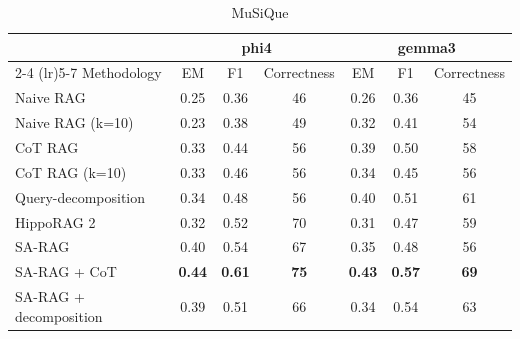 \documentclass{article}
\begin{document}
\begin{table}[h!]
    \centering
    \caption{Results of RAG evaluation on two multi-hop benchmarks.}
    \label{tab:rag_evaluation}

    \begin{subtable}[t]{\textwidth}
        \centering
        \caption{MuSiQue}
        \label{tab:rag_bench2}
        \begin{tabular}{lcccccc}
            \toprule
            & \multicolumn{3}{c}{phi4} & \multicolumn{3}{c}{gemma3} \\
            \cmidrule(lr){2-4} \cmidrule(lr){5-7}
            Methodology & EM & F1 & Correctness & EM & F1 & Correctness \\
            \midrule
            Naive RAG            & 0.25 & 0.36 & 46 & 0.26 & 0.36 & 45 \\
            Naive RAG (k=10)     & 0.23 & 0.38 & 49 & 0.32 & 0.41 & 54 \\
            CoT RAG              & 0.33 & 0.44 & 56 & 0.39 & 0.50 & 58 \\
            CoT RAG (k=10)       & 0.33 & 0.46 & 56 & 0.34 & 0.45 & 56 \\
            Query-decomposition  & 0.34 & 0.48 & 56 & 0.40 & 0.51 & 61 \\
            HippoRAG 2           & 0.32 & 0.52 & 70 & 0.31 & 0.47 & 59\\
            SA-RAG               & 0.40 & 0.54 & 67 & 0.35 & 0.48 & 56 \\
            SA-RAG + CoT          & \textbf{0.44} & \textbf{0.61} & \textbf{75} & \textbf{0.43} & \textbf{0.57} & \textbf{69} \\
            SA-RAG + decomposition& 0.39 & 0.51 & 66 & 0.34 &  0.54 & 63 \\
            \bottomrule
        \end{tabular}
    \end{subtable}

    \vspace{0.5em}


\end{table}
\end{document}
